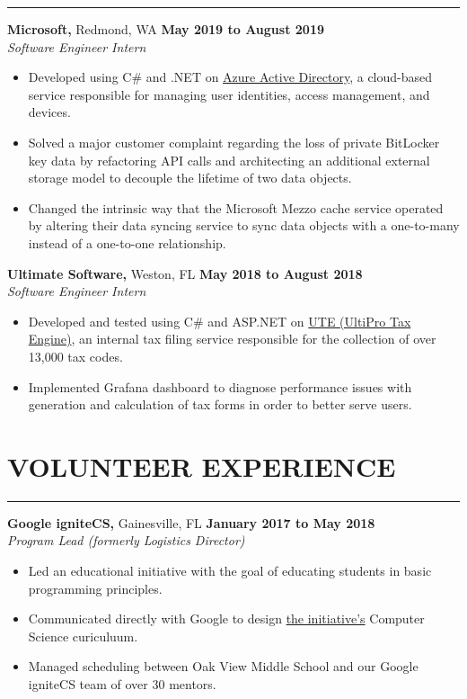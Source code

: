 \documentclass[11pt]{article}
\newcommand*{\sectionheaderspace}{\vspace{.40cm}}
\newcommand*{\subsectionspace}{\vspace{.20cm}}
\begin{document}
	\hrule \relax
	\sectionheaderspace
	
	\noindent \textbf{Microsoft,} Redmond, WA \hfill\textbf{May 2019 to August 2019}\\
	\textit{Software Engineer Intern}
	\begin{itemize}[noitemsep,nolistsep, label = {-}]
		\item Developed using C\# and .NET on \href{https://docs.microsoft.com/en-us/azure/active-directory/fundamentals/active-directory-whatis}{Azure Active Directory}, a cloud-based service responsible for managing user identities, access management, and devices.
		\item Solved a major customer complaint regarding the loss of private BitLocker key data by refactoring API calls and architecting an additional external storage model to decouple the lifetime of two data objects.
		\item Changed the intrinsic way that the Microsoft Mezzo cache service operated by altering their data syncing service to sync data objects with a one-to-many instead of a one-to-one relationship.
	\end{itemize}
	\subsectionspace
	
	\noindent \textbf{Ultimate Software,} Weston, FL \hfill\textbf{May 2018 to August 2018}\\
	\textit{Software Engineer Intern}
	\begin{itemize}[noitemsep,nolistsep, label = {-}]
		\item Developed and tested using C\# and ASP.NET on \href{https://www.ultimatesoftware.com/UltiPro-Solution-Features-Payment-Services}{UTE (UltiPro Tax Engine)}, an internal tax filing service responsible for the collection of over 13,000 tax codes.
		\item Implemented Grafana dashboard to diagnose performance issues with generation and calculation of tax forms in order to better serve users.
	\end{itemize}

	\subsectionspace

	\section*{VOLUNTEER EXPERIENCE}

	\hrule \relax
	\sectionheaderspace

	\noindent\textbf{Google igniteCS,} Gainesville, FL \hfill\textbf{January 2017 to May 2018}\\
	\textit{Program Lead (formerly Logistics Director)}
	\begin{itemize}[noitemsep,nolistsep, label = {-}]
		\item Led an educational initiative with the goal of educating students in basic programming principles.
		\item Communicated directly with Google to design \href{https://sites.google.com/view/ignitecs/home}{the initiative's} Computer Science curiculuum.
		\item Managed scheduling between Oak View Middle School and our Google igniteCS team of over 30 mentors.
	\end{itemize} 
	\subsectionspace
\end{document}
